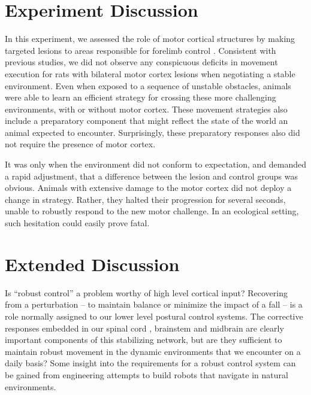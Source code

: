 \section{Experiment Discussion}

In this experiment, we assessed the role of motor cortical structures by making targeted lesions to areas responsible for forelimb control \cite{Kawai2015,Otchy2015}. Consistent with previous studies, we did not observe any conspicuous deficits in movement execution for rats with bilateral motor cortex lesions when negotiating a stable environment. Even when exposed to a sequence of unstable obstacles, animals were able to learn an efficient strategy for crossing these more challenging environments, with or without motor cortex. These movement strategies also include a preparatory component that might reflect the state of the world an animal expected to encounter. Surprisingly, these preparatory responses also did not require the presence of motor cortex.

It was only when the environment did not conform to expectation, and demanded a rapid adjustment, that a difference between the lesion and control groups was obvious. Animals with extensive damage to the motor cortex did not deploy a change in strategy. Rather, they halted their progression for several seconds, unable to robustly respond to the new motor challenge. In an ecological setting, such hesitation could easily prove fatal.

\section{Extended Discussion}

Is ``robust control'' a problem worthy of high level cortical input? Recovering from a perturbation -- to maintain balance or minimize the impact of a fall -- is a role normally assigned to our lower level postural control systems. The corrective responses embedded in our spinal cord \cite{Sherrington1893b,Sherrington1910}, brainstem \cite{Arshian2014} and midbrain \cite{Grillner1973} are clearly important components of this stabilizing network, but are they sufficient to maintain robust movement in the dynamic environments that we encounter on a daily basis? Some insight into the requirements for a robust control system can be gained from engineering attempts to build robots that navigate in natural environments.

